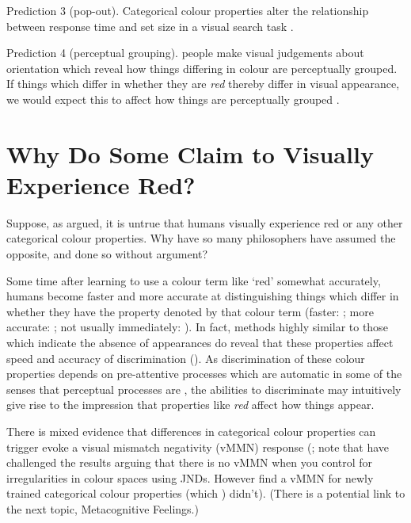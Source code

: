 \documentclass[12pt]{extarticle}
\begin{document}
\begin{multicols*}{3}
Prediction 3 (pop-out). Categorical colour properties alter the relationship between response time and set size in a visual search task \citep{Daoutis:2006ij}.

Prediction 4 (perceptual grouping). people make visual judgements about orientation which
reveal how things differing in colour are perceptually grouped.  If things which differ in whether
they are \emph{red} thereby differ in visual appearance, we would expect
this to affect how things are perceptually grouped \citet{webster:2012_color}.




\section{Why Do Some Claim to Visually Experience Red?}

Suppose, as argued, it is untrue that humans visually experience red or any
other categorical colour properties.
Why have so many philosophers have assumed the opposite, and done so without argument?

Some time after learning to use a colour term like ‘red’
somewhat accurately, humans become faster and more accurate at
distinguishing things which differ in whether they have the property
denoted by that colour term (faster: \citealp{Bornstein:1984cb}; more
accurate: \citealp[p.\ 22--7]{Roberson:1999rk}; not usually immediately:
\citealp{Franklin:2005hp}). In fact, methods highly similar to those which
indicate the absence of appearances do reveal that these properties affect
speed and accuracy of discrimination (\citealp{witzel:2014_categorical}).
As discrimination of these colour properties depends on pre-attentive
processes which are automatic in some of the senses that perceptual
processes are \citep[e.g][]{Daoutis:2006ij}, the abilities to
discriminate may intuitively give rise to the impression that properties
like \emph{red} affect how things appear.

There is mixed evidence that differences in categorical colour properties can trigger evoke a visual mismatch negativity (vMMN) response (\citet{clifford_color_2010}; note that \citet{he:2014_color} have challenged the results arguing that there is no vMMN when you control for irregularities in
    colour spaces using JNDs. However \citet{zhong:2015_shortterm} find a vMMN for 
    newly trained categorical colour properties (which \citep{clifford:2012_neural}) didn’t).
    (There is a potential link to the next topic, Metacognitive Feelings.)




\end{multicols*}
\end{document}
